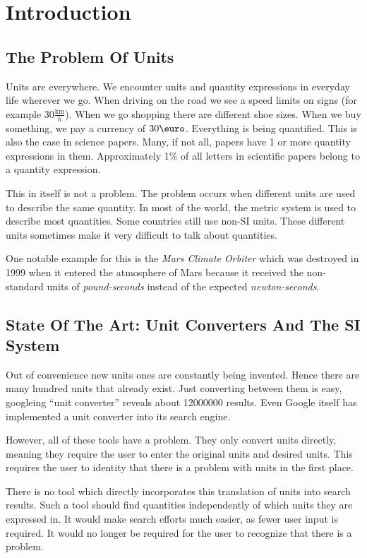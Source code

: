\section{Introduction}

\subsection{The Problem Of Units}

Units are everywhere. We encounter units and quantity expressions in everyday life wherever we go. When driving on the road we see a speed limits on signs (for example $30 \frac{\text{km}}{h}$). When we go shopping there are different shoe sizes. When we buy something, we pay a currency of $30 \text{\euro}$. Everything is being quantified. This is also the case in science papers. Many, if not all, papers have 1 or more quantity expressions in them. Approximately 1\% of all letters in scientific papers belong to a quantity expression.

This in itself is not a problem. The problem occurs when different units are used to describe the same quantity. In most of the world, the metric system is used to describe most quantities. Some countries still use non-SI units. These different units sometimes make it very difficult to talk about quantities.

One notable example for this is the \textit{Mars Climate Orbiter} which was destroyed in 1999 when it entered the atmosphere of Mars because it received the non-standard units of \textit{pound-seconds} instead of the expected \textit{newton-seconds}\cite{nasa:mcor}.

\subsection{State Of The Art: Unit Converters And The SI System}

Out of convenience new units ones are constantly being invented. Hence there are many hundred units that already exist. Just converting between them is easy, googleing ``unit converter'' reveals about 12000000 results. Even Google itself has implemented a unit converter into its search engine.

However, all of these tools have a problem. They only convert units directly, meaning they require the user to enter the original units and desired units. This requires the user to identity that there is a problem with units in the first place.

There is no tool which directly incorporates this translation of units into search results. Such a tool should find quantities independently of which units they are expressed in. It would make search efforts much easier, as fewer user input is required. It would no longer be required for the user to recognize that there is a problem.

